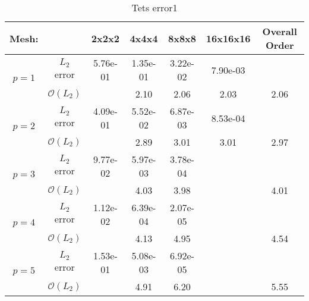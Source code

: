 \begin{table}[H]
\centering
\begin{tabular}{ c c c c c c c} 
  
 Mesh: &   & 2x2x2 & 4x4x4 & 8x8x8 & 16x16x16 & Overall Order \\ 
 \hline 
 \multirow{2}{*}{$p = 1$} & $L_2$ error & 5.76e-01 & 1.35e-01 & 3.22e-02 & 7.90e-03 &   \\ 
  
   & $\mathcal{O}(L_2)$ &   & 2.10 & 2.06 & 2.03 & 2.06 \\ 
 \hline 
 \multirow{2}{*}{$p = 2$} & $L_2$ error & 4.09e-01 & 5.52e-02 & 6.87e-03 & 8.53e-04 &   \\ 
  
   & $\mathcal{O}(L_2)$ &   & 2.89 & 3.01 & 3.01 & 2.97 \\ 
 \hline 
 \multirow{2}{*}{$p = 3$} & $L_2$ error & 9.77e-02 & 5.97e-03 & 3.78e-04 &   &   \\ 
  
   & $\mathcal{O}(L_2)$ &   & 4.03 & 3.98 &   & 4.01 \\ 
 \hline 
 \multirow{2}{*}{$p = 4$} & $L_2$ error & 1.12e-02 & 6.39e-04 & 2.07e-05 &   &   \\ 
  
   & $\mathcal{O}(L_2)$ &   & 4.13 & 4.95 &   & 4.54 \\ 
 \hline 
 \multirow{2}{*}{$p = 5$} & $L_2$ error & 1.53e-01 & 5.08e-03 & 6.92e-05 &   &   \\ 
  
   & $\mathcal{O}(L_2)$ &   & 4.91 & 6.20 &   & 5.55 \\ 
 \hline 
 \end{tabular}
\caption{Tets error1} 
 \end{table}
